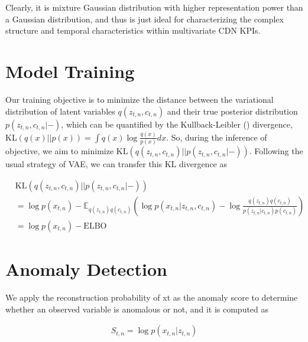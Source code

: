 \documentclass[a0,portrait]{a0poster}
\begin{document}
\begin{multicols}{2}
Clearly, it is mixture Gaussian distribution with higher representation power than a Gaussian distribution, and thus is just
ideal for characterizing the complex structure and temporal
characteristics within multivariate CDN KPIs.

\section*{Model Training}

Our training objective is to minimize the distance between the variational distribution of latent variables $q\left(z_{t,n},c_{t,n}\right)$ and their true posterior distribution $p(z_{t,n}, c_{t,n}| - )$, which can be quantified by the Kullback-Leibler () divergence, $\text{KL}\left(q(x)||p(x)\right) = \int q(x) \log \frac{q(x)}{p(x)}dx$. So, during the inference of objective, we aim to minimize $\text{KL}\left(q(z_{t,n}, c_{t,n})||p({z_{t,n},c_{t,n}}|-)\right)$. Following the usual strategy of VAE, we can transfer this KL divergence as

\begin{equation}
	\begin{aligned}
		&\text{KL} \left(q(z_{t,n}, c_{t,n})||p\left(z_{t,n}, c_{t,n}|- \right)\right) \\
		&= \log p(x_{t,n}) - \mathbb{E}_{q(z_{t,n})q(c_{t,n})} \left(\log p(x_{t,n}|z_{t,n}, c_{t,n}) - \log \frac{q(z_{t,n})q(c_{t,n})}{p(z_{t,n}|c_{t,n})p(c_{t,n})}\right)  \\
		&= \log p(x_{t,n}) - \text{ELBO}
	\end{aligned}
\end{equation}

\section*{Anomaly Detection}

We apply the reconstruction probability of xt as the anomaly score to determine whether an observed variable is anomalous or not\cite{b3}, and it is computed as

\begin{equation}
	\begin{aligned}
		S_{t,n} = \log p(x_{t,n}|z_{t,n})
	\end{aligned}
\end{equation}



\end{multicols}
\end{document}
